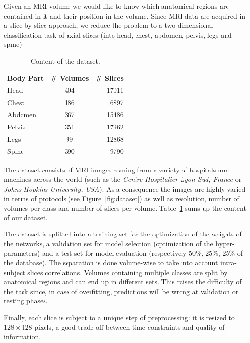 Given an MRI volume we would like to know which anatomical regions are contained in it and their position in the volume. Since MRI data are acquired in a slice by slice approach, we reduce the problem to a two dimensional classification task of axial slices (into head, chest, abdomen, pelvis, legs and spine).

\begin{table}[htb]
	\centering
	\begin{tabular}{ | l | c | r | }
		\hline
		Body Part & \# Volumes & \# Slices \\ \hline
		Head & 404 & 17011 \\
		Chest & 186 & 6897 \\
		Abdomen & 367 & 15486 \\
		Pelvis & 351 & 17962 \\
		Legs & 99 & 12868 \\
		Spine & 390 & 9790 \\
		\hline
	\end{tabular}
	\caption{Content of the dataset.}
	\label{table:dataset}
\end{table}

The dataset consists of MRI images coming from a variety of hospitals and machines across the world (such as the \textit{Centre Hospitalier Lyon-Sud, France} or \textit{ Johns Hopkins University, USA}). As a consequence the images are highly varied in terms of protocols (see Figure~\ref{fig:dataset}) as well as resolution, number of volumes per class and number of slices per volume. Table~\ref{table:dataset} sums up the content of our dataset.

The dataset is splitted into a training set for the optimization of the weights of the networks, a validation set for model selection (optimization of the hyper-parameters) and a test set for model evaluation (respectively $50 \%$, $25 \%$, $25 \%$ of the database). The separation is done volume-wise to take into account intra-subject slices correlations. Volumes containing multiple classes are split by anatomical regions and can end up in different sets. This raises the difficulty of the task since, in case of overfitting, predictions will be wrong at validation or testing phases.


Finally, each slice is subject to a unique step of preprocessing: it is resized to $128 \times 128$ pixels, a good trade-off between time constraints and quality of information.

